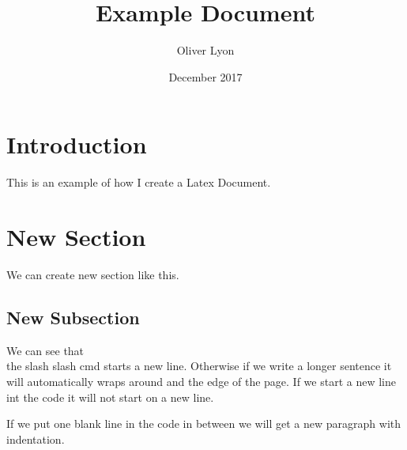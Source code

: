 \documentclass{article}
\title{Example Document}
\author{Oliver Lyon }
\date{December 2017}
\begin{document}
\maketitle

\section{Introduction}
    This is an example of how I create a Latex Document.

\section{New Section}
    We can create new section like this.
    \subsection{New Subsection}
        We can see that\\
        the slash slash cmd starts a new line. Otherwise if we write a longer sentence it will automatically wraps around and the edge of the page.
        If we start a new line int the code it will not start on a new line.\cite{ME} %

        If we put one blank line in the code in between we will get a new paragraph with indentation.
\end{document}
